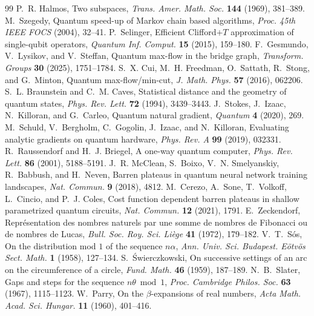 \documentclass[11pt,reqno]{amsart}
\theoremstyle{definition}
\theoremstyle{remark}
\numberwithin{equation}{section}
\begin{document}
\begin{thebibliography}{99}
 P.~R. Halmos, Two subspaces, \emph{Trans. Amer. Math. Soc.} \textbf{144} (1969), 381--389.
 M.~Szegedy, Quantum speed-up of Markov chain based algorithms, \emph{Proc. 45th IEEE FOCS} (2004), 32--41.
 P.~Selinger, Efficient Clifford$+T$ approximation of single-qubit operators, \emph{Quantum Inf. Comput.} \textbf{15} (2015), 159--180.
 F.~Gesmundo, V.~Lysikov, and V.~Steffan, Quantum max-flow in the bridge graph, \emph{Transform. Groups} \textbf{30} (2025), 1751--1784.
 S.~X. Cui, M.~H. Freedman, O.~Sattath, R.~Stong, and G.~Minton, Quantum max-flow/min-cut, \emph{J. Math. Phys.} \textbf{57} (2016), 062206.
 S.~L. Braunstein and C.~M. Caves, Statistical distance and the geometry of quantum states, \emph{Phys. Rev. Lett.} \textbf{72} (1994), 3439--3443.
 J.~Stokes, J.~Izaac, N.~Killoran, and G.~Carleo, Quantum natural gradient, \emph{Quantum} \textbf{4} (2020), 269.
 M.~Schuld, V.~Bergholm, C.~Gogolin, J.~Izaac, and N.~Killoran, Evaluating analytic gradients on quantum hardware, \emph{Phys. Rev. A} \textbf{99} (2019), 032331.
 R.~Raussendorf and H.~J. Briegel, A one-way quantum computer, \emph{Phys. Rev. Lett.} \textbf{86} (2001), 5188--5191.
 J.~R. McClean, S.~Boixo, V.~N. Smelyanskiy, R.~Babbush, and H.~Neven, Barren plateaus in quantum neural network training landscapes, \emph{Nat. Commun.} \textbf{9} (2018), 4812.
 M.~Cerezo, A.~Sone, T.~Volkoff, L.~Cincio, and P.~J. Coles, Cost function dependent barren plateaus in shallow parametrized quantum circuits, \emph{Nat. Commun.} \textbf{12} (2021), 1791.
 E.~Zeckendorf, Repr\'esentation des nombres naturels par une somme de nombres de Fibonacci ou de nombres de Lucas, \emph{Bull. Soc. Roy. Sci. Li\`ege} \textbf{41} (1972), 179--182.
 V.~T.~S\'os, On the distribution mod $1$ of the sequence $n\alpha$, \emph{Ann. Univ. Sci. Budapest. E\"otv\"os Sect. Math.} \textbf{1} (1958), 127--134.
 S.~\'Swierczkowski, On successive settings of an arc on the circumference of a circle, \emph{Fund. Math.} \textbf{46} (1959), 187--189.
 N.~B.~Slater, Gaps and steps for the sequence $n\theta\bmod 1$, \emph{Proc. Cambridge Philos. Soc.} \textbf{63} (1967), 1115--1123.
 W.~Parry, On the $\beta$-expansions of real numbers, \emph{Acta Math. Acad. Sci. Hungar.} \textbf{11} (1960), 401--416.

\end{thebibliography}
\end{document}

